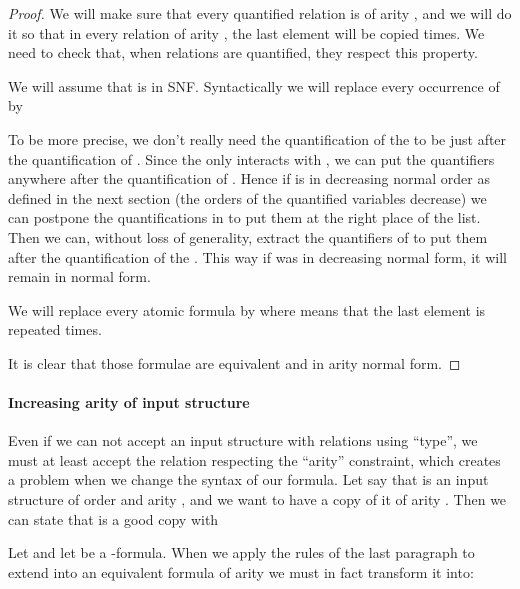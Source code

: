 \documentclass[a4paper,12pt]{article}
\theoremstyle{definition}
\begin{document}
\begin{proof}
We will make sure that every quantified relation is of arity , and
we will do it so that in every relation of arity , the last
element will be copied  times. We need to check that, when
relations are quantified, they respect this property.






We will assume that  is in SNF.  Syntactically we will replace
every occurrence of  by

To be more precise, we don't really need the quantification of the
 to be just after the quantification of . Since the  only interacts with , we can
put the quantifiers anywhere after the quantification of . Hence if  is in decreasing normal
order as defined in the next section (the orders of the quantified variables
decrease) we can postpone the quantifications in  to put them at
the right place of the list. Then we can, without loss of generality,
extract the quantifiers of  to put them after the quantification
of the . This way if  was in decreasing normal form,
it will remain in normal form.

We will replace every atomic formula  by  where 
means that the last element is repeated  times.

It is clear that those formulae are equivalent and in arity normal
form.





\end{proof}

\paragraph{Increasing arity of input structure}
Even if we can not accept an input structure with relations using
``type'', we must at least accept the relation respecting the
``arity'' constraint, which creates a problem when we change the
syntax of our formula. Let say that  is an input structure of order
 and arity , and we want to have a copy  of it of arity
. Then we can state that  is a good copy with

Let  and let
 be a -formula. When we apply the rules of the last
paragraph to extend  into an equivalent formula  of arity
 we must in fact transform it into:
\end{document}
